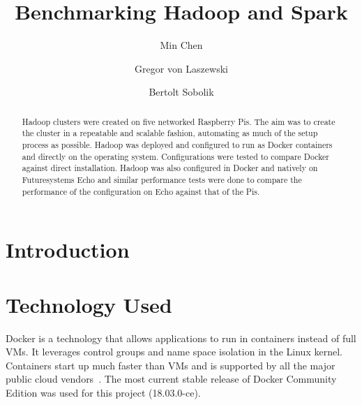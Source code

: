 \title{Benchmarking Hadoop and Spark}


\author{Min Chen}

\author{Gregor von Laszewski}

\author{Bertolt Sobolik}


\renewcommand{\shortauthors}{M. Chen, G. v. Laszewski, B. Sobolik}


\begin{abstract}
Hadoop clusters were created on five networked Raspberry Pis. The aim
was to create the cluster in a repeatable and scalable fashion,
automating as much of the setup process as possible. Hadoop was
deployed and configured to run as Docker containers and directly on
the operating system. Configurations were tested to compare Docker
against direct installation. Hadoop was also configured in Docker and
natively on Futuresystems Echo and similar performance tests were done
to compare the performance of the configuration on Echo against that
of the Pis.
\end{abstract}



\maketitle

\section{Introduction}


\section{Technology Used}
Docker is a technology that allows applications to run in containers
instead of full VMs. It leverages control groups and name space
isolation in the Linux kernel. Containers start up much faster than
VMs and is supported by all the major public cloud
vendors~\cite{Foster:2017:CCS:3158276}. The most current stable
release of Docker Community Edition was used for this project
(18.03.0-ce).


